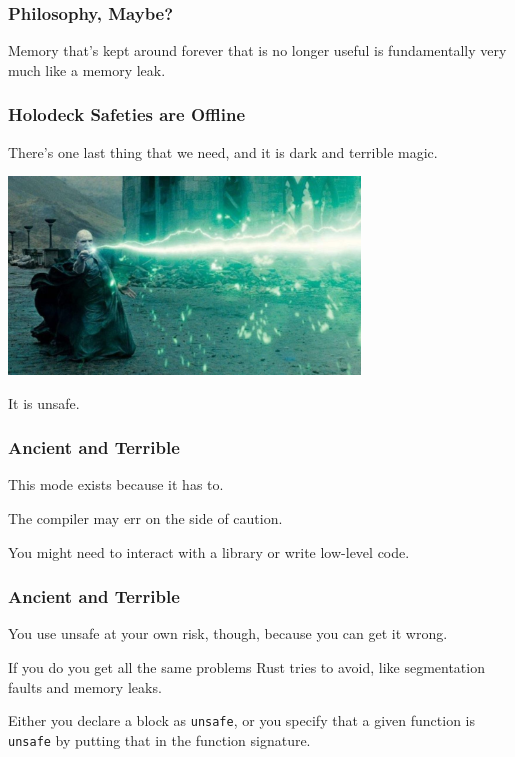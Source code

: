 \begin{frame}
\frametitle{Philosophy, Maybe?}

Memory that's kept around forever that is no longer useful is fundamentally very much like a memory leak.

\end{frame}


\begin{frame}
\frametitle{Holodeck Safeties are Offline}


There's one last thing that we need, and it is dark and terrible magic. 

\begin{center}
	\includegraphics[width=0.7\textwidth]{images/voldemort.jpg}
\end{center}

It is \alert{unsafe}. 

\end{frame}


\begin{frame}
\frametitle{Ancient and Terrible}

This mode exists because it has to.

The compiler may err on the side of caution.

You might need to interact with a library or write low-level code.


\end{frame}

\begin{frame}
\frametitle{Ancient and Terrible}

You use unsafe at your own risk, though, because you can get it wrong.

If you do you get all the same problems Rust tries to avoid, like segmentation faults and memory leaks.

Either you declare a block as \texttt{unsafe}, or you specify that a given function is \texttt{unsafe} by putting that in the function signature. 

\end{frame}


